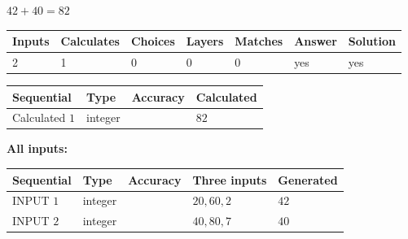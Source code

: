 \documentclass[12pt]{article}
\begin{document}
 

$ %
42 +  %
40=   %
82$
 
 
\noindent{}
 
 

 
   
   
   
   
\noindent\begin{tabular}{|l|l|l|l|l|l|l|}
 \hline
Inputs & Calculates & Choices & Layers & Matches & Answer & Solution \\ \hline
 2  & 
 1  & 
 0
  & 
 0  & 
 0  & 
  yes & 
  yes 
  \\ \hline
 \end{tabular}
   
   
   
   
\noindent{}
   
   
  
  
\noindent\begin{tabular}{|l|l|l|l|}
\hline
 Sequential & Type & Accuracy & Calculated \\ 
\hline
 
 
  Calculated $  1 $ & integer &  & 
  $ 82 $ 
 \\  \hline  
 \end{tabular}
   
   
   
   
\noindent\vspace{0.1in}\hspace{-0.08in} {\textbf{\Large{All inputs: }}}
   
   
  
  
\noindent\begin{tabular}{|l|l|l|l|l|}
\hline
 Sequential & Type & Accuracy & Three inputs & Generated \\ 
\hline
 
 
  INPUT $  1 $ & integer &  & $
 20
 , 
 60
 , 
 2
 $ & $ 42 $ 
 \\  \hline  
 
 
  INPUT $  2 $ & integer &  & $
 40
 , 
 80
 , 
 7
 $ & $ 40 $ 
 \\  \hline  
 \end{tabular}
   
   
   
   
   
   
 \vspace{0.2in}
 
\end{document}

